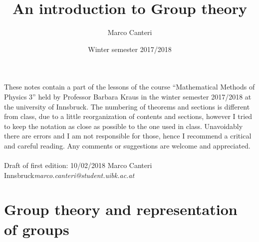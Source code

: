 \documentclass[12pt]{book}
\title{\textbf{An introduction to Group theory}}
\author{Marco Canteri}
\date{Winter semester 2017/2018}
\theoremstyle{plain}
\theoremstyle{definition}
\theoremstyle{remark}
\begin{document}
\maketitle
These notes contain a part of the lessons of the course ``Mathematical Methods of Physics 3'' held by Professor Barbara Kraus in the winter semester 2017/2018 at the university of Innsbruck. The numbering of theorems and sections is different from class, due to a little reorganization of contents and sections, however I tried to keep the notation as close as possible to the one used in class. Unavoidably there are errors and I am not responsible for those, hence I recommend a critical and careful reading. Any comments or suggestions are welcome and appreciated.\\ \\
Draft of first edition: 10/02/2018 \hfill Marco Canteri \\
Innsbruck\hfill \textit{marco.canteri@student.uibk.ac.at}\\
\tableofcontents
\chapter{Group theory and representation of groups}
\end{document}
